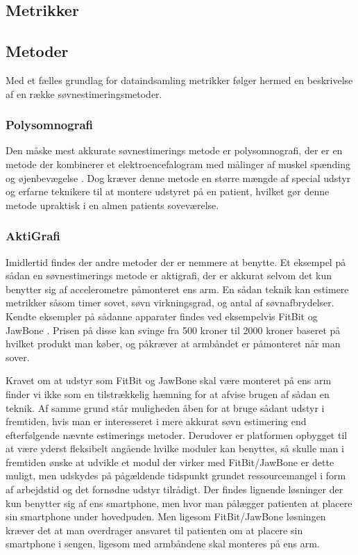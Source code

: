 \subsection{Metrikker}


\subsection{Metoder}
Med et fælles grundlag for dataindsamling metrikker følger hermed en beskrivelse af en række søvnestimeringsmetoder.

\subsubsection{Polysomnografi}
Den måske mest akkurate søvnestimerings metode er polysomnografi, der er en metode der kombinerer et elektroencefalogram med målinger af muskel spænding og øjenbevægelse \citep{misc:polysomnografi,misc:polysomnography}.
Dog kræver denne metode en større mængde af special udstyr og erfarne teknikere til at montere udstyret på en patient, hvilket gør denne metode upraktisk i en almen patients soveværelse.

\subsubsection{AktiGrafi}
Imidlertid findes der andre metoder der er nemmere at benytte.
Et eksempel på sådan en søvnestimerings metode er aktigrafi, der er akkurat selvom det kun benytter sig af accelerometre påmonteret ens arm.
En sådan teknik kan estimere metrikker såsom timer sovet, søvn virkningsgrad, og antal af søvnafbrydelser.
Kendte eksempler på sådanne apparater findes ved eksempelvis FitBit og JawBone \citep{misc:fitbitSleepTracking,misc:jawBoneSleepTracking}.
Prisen på disse kan svinge fra 500 kroner til 2000 kroner baseret på hvilket produkt man køber, og påkræver at armbåndet er påmonteret når man sover.

Kravet om at udstyr som FitBit og JawBone skal være monteret på ens arm finder vi ikke som en tilstrækkelig hæmning for at afvise brugen af sådan en teknik.
Af samme grund står muligheden åben for at bruge sådant udstyr i fremtiden, hvis man er interesseret i mere akkurat søvn estimering end efterfølgende nævnte estimerings metoder.
Derudover er platformen opbygget til at være yderst fleksibelt angående hvilke moduler kan benyttes, så skulle man i fremtiden ønske at udvikle et modul der virker med FitBit/JawBone er dette muligt, men udskydes på pågældende tidspunkt grundet ressourcemangel i form af arbejdstid og det fornødne udstyr tilrådigt.
Der findes lignende løsninger der kun benytter sig af ens smartphone, men hvor man pålægger patienten at placere sin smartphone under hovedpuden.
Men ligesom FitBit/JawBone løsningen kræver det at man overdrager ansvaret til patienten om at placere sin smartphone i sengen, ligesom med armbåndene skal monteres på ens arm.


